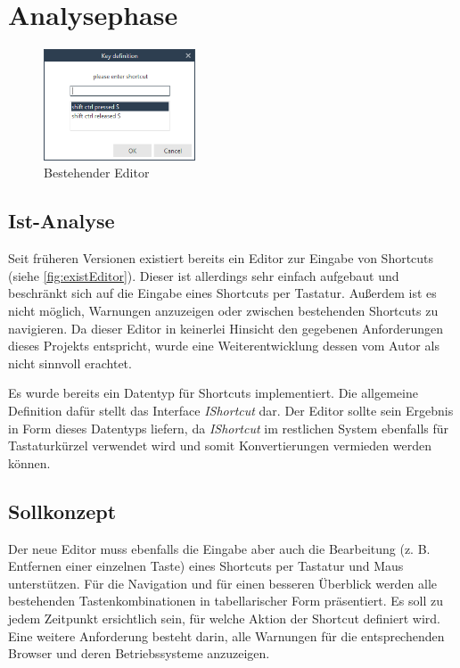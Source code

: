 \section{Analysephase}

\begin{figure}
	\vspace{-12px}
	\centering
	\includegraphics[width=170px]{../graphic/images/screenshots/Alter-Editor}
	\caption{Bestehender Editor}
	\label{fig:existEditor}
\end{figure}

\subsection{Ist-Analyse}

Seit früheren Versionen existiert bereits ein Editor zur Eingabe von Shortcuts (siehe \autoref{fig:existEditor}). Dieser ist allerdings sehr einfach aufgebaut und beschränkt sich auf die Eingabe eines Shortcuts per Tastatur. Außerdem ist es nicht möglich, Warnungen anzuzeigen oder zwischen bestehenden Shortcuts zu navigieren. Da dieser Editor in keinerlei Hinsicht den gegebenen Anforderungen dieses Projekts entspricht, wurde eine Weiterentwicklung dessen vom Autor als nicht sinnvoll erachtet.

Es wurde bereits ein Datentyp für Shortcuts implementiert. Die allgemeine Definition dafür stellt das Interface \emph{IShortcut} dar. Der Editor sollte sein Ergebnis in Form dieses Datentyps liefern, da \emph{IShortcut} im restlichen System ebenfalls für Tastaturkürzel verwendet wird und somit Konvertierungen vermieden werden können.

\subsection{Sollkonzept}

Der neue Editor muss ebenfalls die Eingabe aber auch die Bearbeitung (z. B. Entfernen einer einzelnen Taste) eines Shortcuts per Tastatur und Maus unterstützen. Für die Navigation und für einen besseren Überblick werden alle bestehenden Tastenkombinationen in tabellarischer Form präsentiert. Es soll zu jedem Zeitpunkt ersichtlich sein, für welche Aktion der Shortcut definiert wird. Eine weitere Anforderung besteht darin, alle Warnungen für die entsprechenden Browser und deren Betriebssysteme anzuzeigen.

